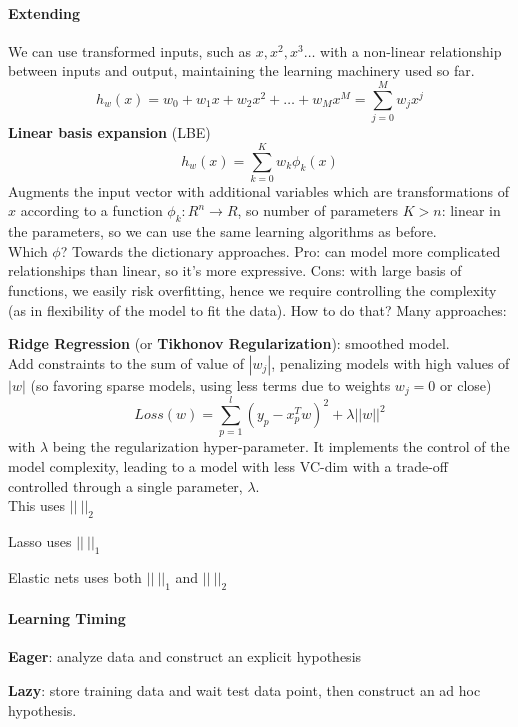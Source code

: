 \documentclass[10pt]{report}
\begin{document}
\paragraph{Extending} We can use transformed inputs, such as $x, x^2, x^3\ldots$ with a non-linear relationship between inputs and output, maintaining the learning machinery used so far. $$h_w(x) = w_0 + w_1 x + w_2 x^2 + \ldots + w_M x^M = \sum_{j=0}^M w_j x^j$$ \textbf{Linear basis expansion} (LBE) $$h_w(x) = \sum_{k=0}^K w_k\phi_k(x)$$ Augments the input vector with additional variables which are transformations of $x$ according to a function $\phi_k : R^n \rightarrow R$, so number of parameters $K > n$: linear in the parameters, so we can use the same learning algorithms as before.\\
Which $\phi$? Towards the dictionary approaches. Pro: can model more complicated relationships than linear, so it's more expressive. Cons: with large basis of functions, we easily risk overfitting, hence we require controlling the complexity (as in flexibility of the model to fit the data). How to do that? Many approaches:
\begin{list}{}{}
	\item \textbf{Ridge Regression} (or \textbf{Tikhonov Regularization}): smoothed model.\\
	Add constraints to the sum of value of $|w_j|$, penalizing models with high values of $|w|$ (so favoring sparse models, using less terms due to weights $w_j = 0$ or close)
	$$Loss(w) = \sum_{p=1}^l (y_p - x_p^T w)^2 + \lambda||w||^2$$ with $\lambda$ being the regularization hyper-parameter. It implements the control of the model complexity, leading to a model with less VC-dim with a trade-off controlled through a single parameter, $\lambda$.\\
	This uses $||\:||_2$
	\item Lasso uses $||\:||_1$
	\item Elastic nets uses both $||\:||_1$ and $||\:||_2$
\end{list}
\paragraph{Learning Timing} \begin{list}{}{}
	\item \textbf{Eager}: analyze data and construct an explicit hypothesis
	\item \textbf{Lazy}: store training data and wait test data point, then construct an ad hoc hypothesis.
\end{list}
\end{document}
